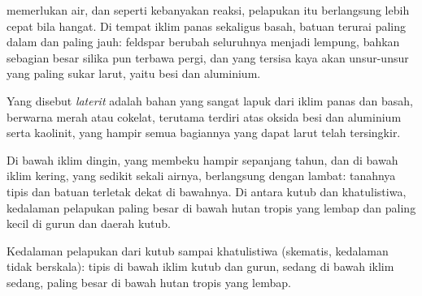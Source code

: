  memerlukan air, dan seperti kebanyakan reaksi, pelapukan itu
berlangsung lebih cepat bila hangat. Di tempat iklim panas sekaligus basah,
batuan terurai paling dalam dan paling jauh: feldspar berubah seluruhnya
menjadi lempung, bahkan sebagian besar silika pun terbawa pergi, dan yang
tersisa kaya akan unsur-unsur yang paling sukar larut, yaitu besi dan
aluminium.

\begin{definition}[Laterit]\label{def:g10:soil-formation:laterite}
Yang disebut \emph{laterit} adalah bahan yang sangat lapuk dari
iklim panas dan basah, berwarna merah atau cokelat, terutama terdiri atas
oksida besi dan aluminium serta kaolinit, yang hampir semua bagiannya yang
dapat larut telah tersingkir.
\end{definition}

Di bawah iklim dingin, yang membeku hampir sepanjang tahun, dan di bawah iklim
kering, yang sedikit sekali airnya,  berlangsung dengan lambat:
tanahnya tipis
dan batuan terletak dekat di bawahnya. Di antara kutub dan khatulistiwa,
kedalaman pelapukan paling besar di bawah hutan tropis yang lembap dan paling
kecil di gurun dan daerah kutub.

\begin{omfigure}

{\small Kedalaman pelapukan dari kutub sampai khatulistiwa (skematis,
kedalaman tidak berskala): tipis di bawah iklim kutub dan gurun, sedang di
bawah iklim sedang, paling besar di bawah hutan tropis yang lembap.}
\end{omfigure}

